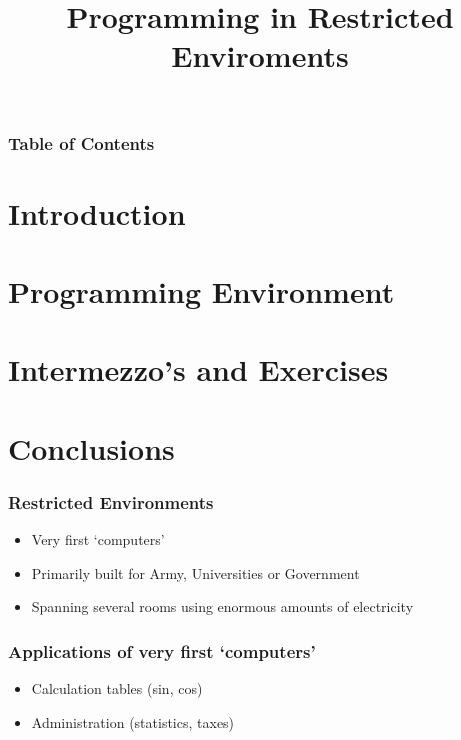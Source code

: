 \documentclass[aspectratio=43]{uva-inf-presentation}
\title{Programming in Restricted Enviroments}
\begin{document}
\begin{titelframe}
\titlepage

\end{titelframe}

\begin{frame}
\frametitle{Table of Contents}
\tableofcontents
\end{frame}


\section{Introduction}
\section{Programming Environment}
\section{Intermezzo's and Exercises}

\section{Conclusions}


\begin{frame}
\frametitle{Restricted Environments}

\begin{itemize}
\item Very first `computers'
\item Primarily built for Army, Universities or Government
\item Spanning several rooms using enormous amounts of electricity
\end{itemize}

\end{frame}


\begin{frame}
\frametitle{Applications of very first `computers'}

\begin{itemize}
\item Calculation tables (sin, cos)
\item Administration (statistics, taxes)
\end{itemize}

\end{frame}
\end{document}
